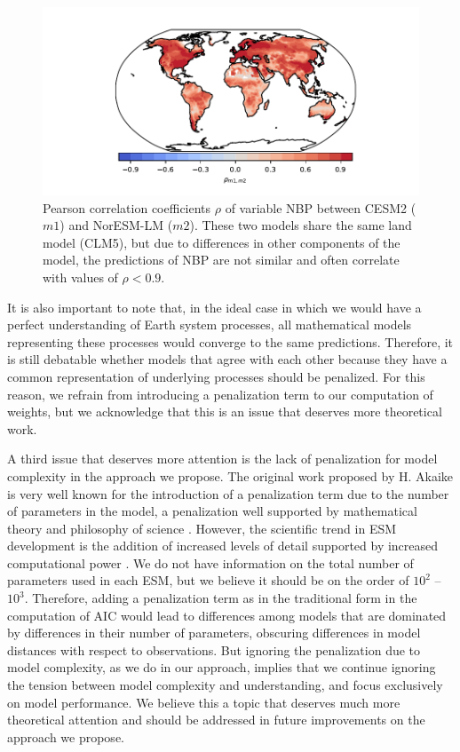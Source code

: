 \documentclass[gmd, manuscript]{copernicus}
\begin{document}
\begin{figure}[t]
   \centering
   \includegraphics[width=14cm]{Figures/Corr_CESM_NorESM.pdf} %
   \caption{Pearson correlation coefficients $\rho$ of variable NBP between CESM2 ($m1$) and NorESM-LM ($m2$). These two models share the same land model (CLM5), but due to differences in other components of the model, the predictions of NBP are not similar and often correlate with values of $\rho < 0.9$.}
   \label{fig:corr}
\end{figure}


It is also important to note that, in the ideal case in which we would have a perfect understanding of Earth system processes, all mathematical models representing these processes would converge to the same predictions. Therefore, it is still debatable whether models that agree with each other because they have a common representation of underlying processes should be penalized. For this reason, we refrain from introducing a penalization term to our computation of weights, but we acknowledge that this is an issue that deserves more theoretical work. 

A third issue that deserves more attention is the lack of penalization for model complexity in the approach we propose. The original work proposed by H. Akaike is very well known for the introduction of a penalization term due to the number of parameters in the model, a penalization well supported by mathematical theory and philosophy of science \citep{Akaike1974, Akaike1981}. However, the scientific trend in ESM development is the addition of increased levels of detail supported by increased computational power \citep{Held2005, Held2014}. We do not have information on the total number of parameters used in each ESM, but we believe it should be on the order of $10^2$ -- $10^3$. Therefore, adding a penalization term as in the traditional form in the computation of AIC would lead to differences among models that are dominated by differences in their number of parameters, obscuring differences in model distances with respect to observations. But ignoring the penalization due to model complexity, as we do in our approach, implies that we continue ignoring the tension between model complexity and understanding, and focus exclusively on model performance. We believe this a topic that deserves much more theoretical attention and should be addressed in future improvements on the approach we propose. 
\end{document}
